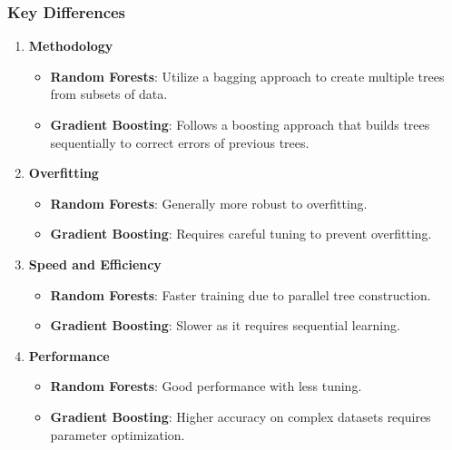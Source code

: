 \documentclass[aspectratio=169]{beamer}
\begin{document}
\begin{frame}
    \frametitle{Key Differences}
    \begin{enumerate}
        \item \textbf{Methodology}
        \begin{itemize}
            \item \textbf{Random Forests}: Utilize a bagging approach to create multiple trees from subsets of data.
            \item \textbf{Gradient Boosting}: Follows a boosting approach that builds trees sequentially to correct errors of previous trees.
        \end{itemize}
        
        \item \textbf{Overfitting}
        \begin{itemize}
            \item \textbf{Random Forests}: Generally more robust to overfitting.
            \item \textbf{Gradient Boosting}: Requires careful tuning to prevent overfitting.
        \end{itemize}

        \item \textbf{Speed and Efficiency}
        \begin{itemize}
            \item \textbf{Random Forests}: Faster training due to parallel tree construction.
            \item \textbf{Gradient Boosting}: Slower as it requires sequential learning.
        \end{itemize}

        \item \textbf{Performance}
        \begin{itemize}
            \item \textbf{Random Forests}: Good performance with less tuning.
            \item \textbf{Gradient Boosting}: Higher accuracy on complex datasets requires parameter optimization.
        \end{itemize}
    \end{enumerate}
\end{frame}
\end{document}
